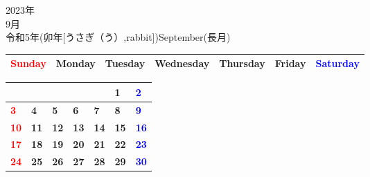 \documentclass[a4paper,landscape]{jsarticle}
\newcommand{\dig}{\hspace{29mm}}
\newcommand{\tdig}{\hspace{27mm}}
\newcommand{\LBF}{\LARGE\textbf}
\begin{document}
\newpage

\begin{center}
	\HUGE 2023年\\
	\huge 9月\\
	\large 令和5年(卯年[うさぎ（う）,rabbit])September(長月)
\end{center}

\begingroup
\renewcommand{\arraystretch}{1.4}
\begin{tabular}{|>{\centering\arraybackslash}p{32mm}|>{\centering\arraybackslash}p{32mm}|>{\centering\arraybackslash}p{32mm}|>{\centering\arraybackslash}p{32mm}|>{\centering\arraybackslash}p{32mm}|>{\centering\arraybackslash}p{32mm}|>{\centering\arraybackslash}p{32mm}|}
\hline
\textcolor{red}{\large Sunday}&\large Monday&\large Tuesday&\large Wednesday&\large Thursday&\large Friday&\textcolor{blue}{\large Saturday}\\
\hline
\end{tabular}
\endgroup

\begingroup
\renewcommand{\arraystretch}{4}
\begin{tabular}{|p{32mm}|p{32mm}|p{32mm}|p{32mm}|p{32mm}|p{32mm}|p{32mm}|}
\hline
&&&&&\raisebox{30pt} {\dig\LBF{1}}&\raisebox{30pt} {\dig\textcolor{blue}{\LBF{2}}}\\
\hline
\raisebox{30pt} {\dig\textcolor{red}{\LBF{3}}}&\raisebox{30pt} {\dig\LBF{4}}&\raisebox{30pt} {\dig\LBF{5}}&\raisebox{30pt} {\dig\LBF{6}}&\raisebox{30pt} {\dig\LBF{7}}&\raisebox{30pt} {\dig\LBF{8}}&\raisebox{30pt} {\dig\textcolor{blue}{\LBF{9}}}\\
\hline
\raisebox{30pt} {\tdig\textcolor{red}{\LBF{10}}}&\raisebox{30pt} {\tdig\LBF{11}}&\raisebox{30pt} {\tdig\LBF{12}}&\raisebox{30pt} {\tdig\LBF{13}}&\raisebox{30pt} {\tdig\LBF{14}}&\raisebox{30pt} {\tdig\LBF{15}}&\raisebox{30pt} {\tdig\textcolor{blue}{\LBF{16}}}\\
\hline
\raisebox{30pt} {\tdig\textcolor{red}{\LBF{17}}}&\raisebox{30pt} {\tdig\LBF{18}}&\raisebox{30pt} {\tdig\LBF{19}}&\raisebox{30pt} {\tdig\LBF{20}}&\raisebox{30pt} {\tdig\LBF{21}}&\raisebox{30pt} {\tdig\LBF{22}}&\raisebox{30pt} {\tdig\textcolor{blue}{\LBF{23}}}\\
\hline
\raisebox{30pt} {\tdig\textcolor{red}{\LBF{24}}}&\raisebox{30pt} {\tdig\LBF{25}}&\raisebox{30pt} {\tdig\LBF{26}}&\raisebox{30pt} {\tdig\LBF{27}}&\raisebox{30pt} {\tdig\LBF{28}}&\raisebox{30pt} {\tdig\LBF{29}}&\raisebox{30pt} {\tdig\textcolor{blue}{\LBF{30}}}\\
\hline
\end{tabular}
\endgroup
\end{document}
